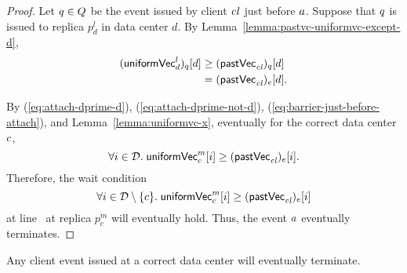 \begin{proof}
  Let $q \in Q$ be the \fence{} event issued by client $\mathit{cl}$
  just before $a$.
  Suppose that $q$ is issued to replica $p^{l}_{d}$ in data center $d$.
  By Lemma~\ref{lemma:pastvc-uniformvc-except-d},
  \begin{align}
    ({\sf uniformVec}^{l}_{d})_{q}[d] &\ge ({\sf pastVec}_{\mathit{cl}})_{q}[d]
      \nonumber\\
      &= ({\sf pastVec}_{\mathit{cl}})_{e}[d].
      \label{eq:barrier-just-before-attach}
  \end{align}

  By (\ref{eq:attach-dprime-d}), (\ref{eq:attach-dprime-not-d}),
  (\ref{eq:barrier-just-before-attach}), and Lemma~\ref{lemma:uniformvc-x},
  eventually for the correct data center $c$,
  \[
    \forall i \in \mathcal{D}.\;
      {\sf uniformVec}^{m}_{c}[i] \ge ({\sf pastVec}_{\mathit{cl}})_{e}[i].
  \]
  Therefore, the wait condition
  \[
    \forall i \in \mathcal{D} \setminus \{c\}.\;
      {\sf uniformVec}^{m}_{c}[i] \ge ({\sf pastVec}_{\mathit{cl}})_{e}[i]
  \]
  at line~\code{\ref{alg:unistore-replica}}{\ref{line:attach-wait-condition}}
  at replica $p^{m}_{c}$ will eventually hold.
  Thus, the \clattach{} event $a$ eventually terminates.
\end{proof}

\begin{apptheorem} \label{thm:termination}
  Any client event issued at a correct data center
  will eventually terminate.
\end{apptheorem}

